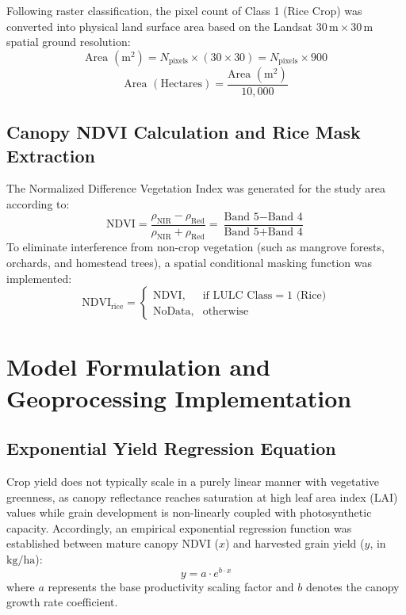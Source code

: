 \documentclass[11pt,a4paper]{article}
\begin{document}
Following raster classification, the pixel count of Class 1 (Rice Crop) was converted into physical land surface area based on the Landsat $30\,\text{m}\times 30\,\text{m}$ spatial ground resolution:
\begin{equation}
\text{Area } (\text{m}^2) = N_{\text{pixels}} \times (30 \times 30) = N_{\text{pixels}} \times 900
\end{equation}
\begin{equation}
\text{Area } (\text{Hectares}) = \frac{\text{Area } (\text{m}^2)}{10,000}
\end{equation}

\subsection{Canopy NDVI Calculation and Rice Mask Extraction}
The Normalized Difference Vegetation Index was generated for the study area according to:
\begin{equation}
\text{NDVI} = \frac{\rho_{\text{NIR}} - \rho_{\text{Red}}}{\rho_{\text{NIR}} + \rho_{\text{Red}}} = \frac{\text{Band 5} - \text{Band 4}}{\text{Band 5} + \text{Band 4}}
\end{equation}
To eliminate interference from non-crop vegetation (such as mangrove forests, orchards, and homestead trees), a spatial conditional masking function was implemented:
\begin{equation}
\text{NDVI}_{\text{rice}} = \begin{cases}
\text{NDVI}, & \text{if } \text{LULC Class} = 1 \text{ (Rice)} \\
\text{NoData}, & \text{otherwise}
\end{cases}
\end{equation}

\section{Model Formulation and Geoprocessing Implementation}

\subsection{Exponential Yield Regression Equation}
Crop yield does not typically scale in a purely linear manner with vegetative greenness, as canopy reflectance reaches saturation at high leaf area index (LAI) values while grain development is non-linearly coupled with photosynthetic capacity. Accordingly, an empirical exponential regression function was established between mature canopy NDVI ($x$) and harvested grain yield ($y$, in $\text{kg/ha}$):
\begin{equation}
y = a \cdot e^{b \cdot x}
\label{eq:yield}
\end{equation}
where $a$ represents the base productivity scaling factor and $b$ denotes the canopy growth rate coefficient.
\end{document}
